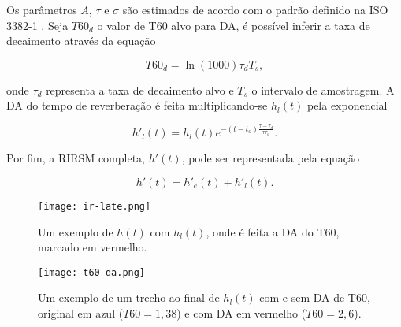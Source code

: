 Os parâmetros $A$, $\tau$ e $\sigma$ são estimados de acordo com o padrão definido na ISO 3382-1 \cite{ISO-3382}.
Seja $T60_d$ o valor de T60 alvo para DA, é possível inferir a taxa de decaimento através da equação

\begin{equation} \label{eqn:decay-rate-t60}
    T60_d = \ln(1000) \tau_d T_s
    ,
\end{equation}

\noindent
onde $\tau_d$ representa a taxa de decaimento alvo e $T_s$ o intervalo de amostragem.
A DA do tempo de reverberação é feita multiplicando-se $h_l(t)$ pela exponencial

\begin{equation} \label{eqn:DA-T60}
    h'_l(t) = h_l(t) e^{-(t - t_o) \frac{\tau - \tau_d}{ \tau \tau_d} }
    .
\end{equation}

Por fim, a RIRSM completa, $h'(t)$, pode ser representada pela equação

\begin{equation} \label{eqn:RIRSM}
    h'(t) = h'_e(t) + h'_l(t)
    .
\end{equation}

\begin{figure}[H]
    \centering
    \texttt{[image: ir-late.png]}
    \caption{Um exemplo de $h(t)$ com $h_l(t)$, onde é feita a DA do T60, marcado em vermelho.}
    \label{fig:ir-late}
\end{figure} 

\begin{figure}[H]
    \centering
    \texttt{[image: t60-da.png]}
    \caption{Um exemplo de um trecho ao final de $h_l(t)$ com e sem DA de T60, original em azul ($T60=1,38$) e com DA em vermelho ($T60=2,6$).}
    \label{fig:t60-da}
\end{figure} 